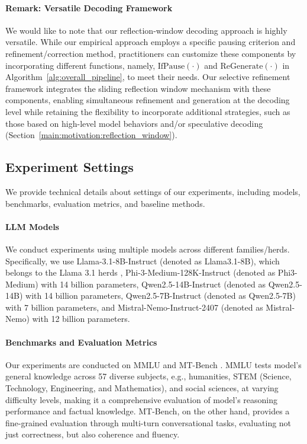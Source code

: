 \paragraph{Remark: Versatile Decoding Framework}
We would like to note that our reflection-window decoding approach is highly versatile.
While our empirical approach employs a specific pausing criterion and refinement/correction method, practitioners can customize these components by incorporating different functions, namely, $\mathrm{IfPause(\cdot)}$ and $\mathrm{ReGenerate(\cdot)}$ in Algorithm~\ref{alg:overall_pipeline}, to meet their needs.
Our selective refinement framework integrates the sliding reflection window mechanism with these components, enabling simultaneous refinement and generation at the decoding level while retaining the flexibility to incorporate additional strategies, such as those based on high-level model behaviors and/or speculative decoding (Section~\ref{main:motivation:reflection_window}).


\subsection{Experiment Settings}\label{main:experiments:setting}
We provide technical details about settings of our experiments, including models, benchmarks, evaluation metrics, and baseline methods.

\paragraph{LLM Models}
We conduct experiments using multiple models across different families/herds.
Specifically, we use Llama-3.1-8B-Instruct (denoted as Llama3.1-8B), which belongs to the Llama 3.1 herds \citep{meta2024llama}, Phi-3-Medium-128K-Instruct \citep{abdin2024phi} (denoted as Phi3-Medium) with 14 billion parameters, Qwen2.5-14B-Instruct \citep{qwen2} (denoted as Qwen2.5-14B) with 14 billion parameters, Qwen2.5-7B-Instruct (denoted as Qwen2.5-7B) with 7 billion parameters, and Mistral-Nemo-Instruct-2407 \citep{mistralNemo} (denoted as Mistral-Nemo) with 12 billion parameters.


\paragraph{Benchmarks and Evaluation Metrics}
Our experiments are conducted on MMLU \citep{hendrycks2020measuring} and MT-Bench \citep{zheng2023judging}.
MMLU tests model's general knowledge across 57 diverse subjects, e.g., humanities, STEM (Science, Technology, Engineering, and Mathematics), and social sciences, at varying difficulty levels, making it a comprehensive evaluation of model's reasoning performance and factual knowledge.
MT-Bench, on the other hand, provides a fine-grained evaluation through multi-turn conversational tasks, evaluating not just correctness, but also coherence and fluency.

